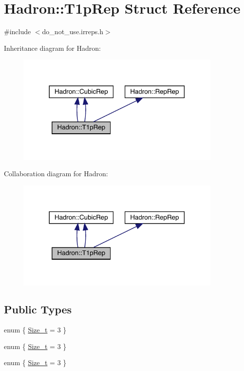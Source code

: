 \hypertarget{structHadron_1_1T1pRep}{}\section{Hadron\+:\+:T1p\+Rep Struct Reference}
\label{structHadron_1_1T1pRep}


{\ttfamily \#include $<$do\+\_\+not\+\_\+use.\+irreps.\+h$>$}



Inheritance diagram for Hadron\+:\nopagebreak
\begin{figure}[H]
\begin{center}
\leavevmode
\includegraphics[width=288pt]{d3/d9b/structHadron_1_1T1pRep__inherit__graph}
\end{center}
\end{figure}


Collaboration diagram for Hadron\+:\nopagebreak
\begin{figure}[H]
\begin{center}
\leavevmode
\includegraphics[width=288pt]{df/d19/structHadron_1_1T1pRep__coll__graph}
\end{center}
\end{figure}
\subsection*{Public Types}
\begin{DoxyCompactItemize}
\item 
enum \{ \mbox{\hyperlink{structHadron_1_1T1pRep_a24db1c512cfbbf50eee95d072b37208aace463da5e26ea39d45d01b927116be67}{Size\+\_\+t}} = 3
 \}
\item 
enum \{ \mbox{\hyperlink{structHadron_1_1T1pRep_a24db1c512cfbbf50eee95d072b37208aace463da5e26ea39d45d01b927116be67}{Size\+\_\+t}} = 3
 \}
\item 
enum \{ \mbox{\hyperlink{structHadron_1_1T1pRep_a24db1c512cfbbf50eee95d072b37208aace463da5e26ea39d45d01b927116be67}{Size\+\_\+t}} = 3
 \}
\end{DoxyCompactItemize}
